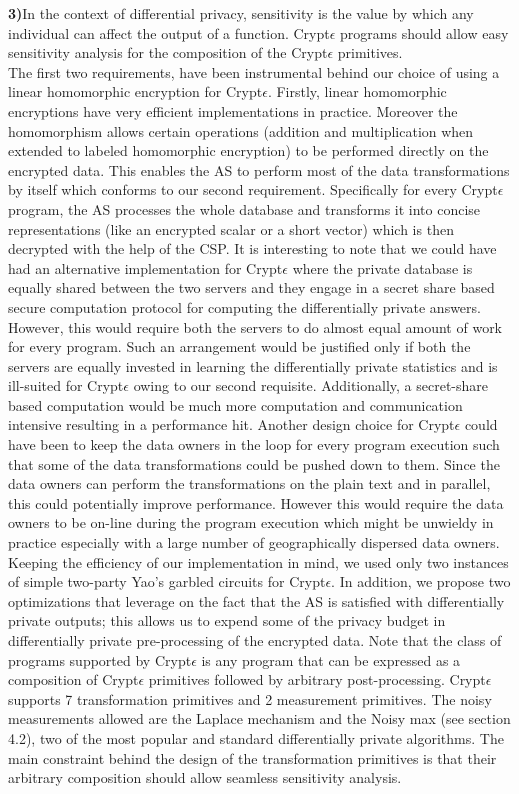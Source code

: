 \textbf{3)}In the context of differential privacy, sensitivity is the value by which any individual can affect the output of a function. Crypt$\epsilon$ programs should allow easy sensitivity analysis for the composition of the Crypt$\epsilon$ primitives. \\
The first two requirements, have been instrumental behind our choice of using a linear homomorphic encryption for Crypt$\epsilon$. Firstly, linear homomorphic encryptions have very efficient implementations in practice. Moreover the homomorphism allows certain operations (addition and multiplication when extended to labeled homomorphic encryption) to be performed directly on the encrypted data. This enables the \textsf{AS} to perform most of the data transformations by itself which conforms to  our second requirement. Specifically for every Crypt$\epsilon$ program, the \textsf{AS} processes the whole database and transforms it into concise representations (like an encrypted scalar or a short vector) which is then decrypted with the help of the \textsf{CSP}. It is interesting to note that we could have had an alternative implementation for Crypt$\epsilon$ where the private database is equally shared between the two servers and they engage in a secret share based secure computation protocol for computing the differentially private answers. However, this would require both the servers to do almost equal amount of work for every program. Such an arrangement would be justified only if both the servers are equally invested in learning the differentially private statistics and is ill-suited for Crypt$\epsilon$ owing to our second requisite. Additionally, a secret-share based computation would be much more computation and communication intensive resulting in a performance hit. Another design choice for Crypt$\epsilon$ could have been to keep the data owners in the loop for every program execution such that some of the data transformations could be pushed down to them. Since the data owners can perform the transformations on the plain text and in parallel, this could potentially improve performance. However this would require the data owners to be on-line during the program execution which might be unwieldy in practice especially with a large number of geographically dispersed data owners.  Keeping the efficiency of our implementation in mind, we used only two instances of simple two-party Yao's garbled circuits for Crypt$\epsilon$. In addition, we propose two optimizations that leverage on the fact that the \textsf{AS} is satisfied with differentially private outputs; this allows  us to expend some of the privacy budget in differentially private pre-processing of the encrypted data. Note that the class of programs supported by Crypt$\epsilon$ is any program that can be expressed as a composition of  Crypt$\epsilon$ primitives followed by arbitrary post-processing. Crypt$\epsilon$ supports 7 transformation primitives and 2 measurement primitives. The noisy measurements allowed are the Laplace mechanism and the Noisy max (see section 4.2), two of the most popular and standard differentially private algorithms. The main constraint behind the design of the transformation primitives is that their arbitrary composition should allow seamless sensitivity analysis.  